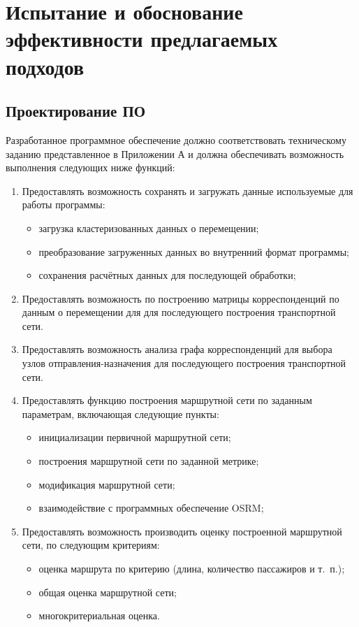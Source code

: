 \chapter{Испытание и обоснование эффективности предлагаемых подходов}
\section{Проектирование ПО}
Разработанное программное обеспечение должно соответствовать техническому заданию представленное в Приложении 
А и должна обеспечивать возможность выполнения следующих ниже функций:
\begin{enumerate}
    \item Предоставлять возможность сохранять и загружать данные используемые для работы программы:
    \begin{itemize}
        \item загрузка кластеризованных данных о перемещении;
        \item преобразование загруженных данных во внутренний формат программы;
        \item сохранения расчётных данных для последующей обработки;
    \end{itemize}
    \item Предоставлять возможность по построению матрицы корреспонденций по данным о перемещении для 
        для последующего построения транспортной сети.
    \item Предоставлять возможность анализа графа корреспонденций для выбора узлов отправления-назначения для 
        последующего построения транспортной сети.
    \item Предоставлять функцию построения маршрутной сети по заданным параметрам, включающая следующие 
        пункты:
    \begin{itemize}
        \item инициализации первичной маршрутной сети;
        \item построения маршрутной сети по заданной метрике;
        \item модификация маршрутной сети;
        \item взаимодействие с программных обеспечение OSRM;
    \end{itemize}
    \item Предоставлять возможность производить оценку построенной маршрутной сети, по следующим критериям:
    \begin{itemize}
        \item оценка маршрута по критерию (длина, количество пассажиров и т.~п.);
        \item общая оценка маршрутной сети;
        \item многокритериальная оценка.
    \end{itemize}
\end{enumerate}

